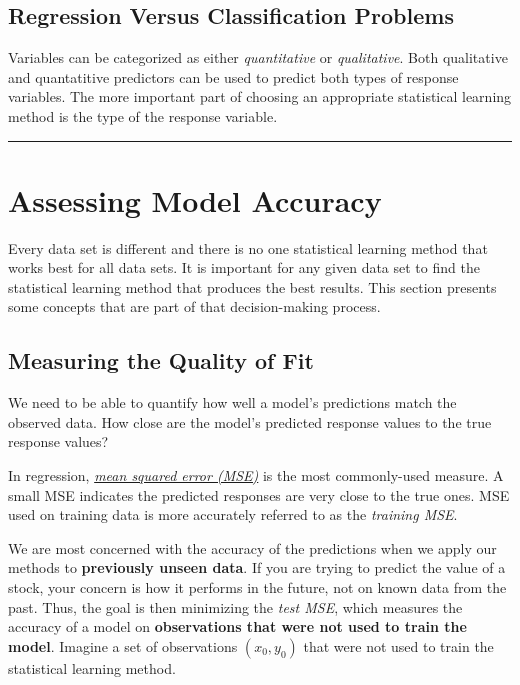 \documentclass[]{book}
\begin{document}
\hypertarget{regression-versus-classification-problems}{%
\subsection{Regression Versus Classification Problems}\label{regression-versus-classification-problems}}

Variables can be categorized as either \emph{quantitative} or \emph{qualitative}. Both qualitative and quantatitive predictors can be used to predict both types of response variables. The more important part of choosing an appropriate statistical learning method is the type of the response variable.

\begin{center}\rule{0.5\linewidth}{\linethickness}\end{center}

\hypertarget{assessing-model-accuracy}{%
\section{Assessing Model Accuracy}\label{assessing-model-accuracy}}

Every data set is different and there is no one statistical learning method that works best for all data sets. It is important for any given data set to find the statistical learning method that produces the best results. This section presents some concepts that are part of that decision-making process.

\hypertarget{measuring-the-quality-of-fit}{%
\subsection{Measuring the Quality of Fit}\label{measuring-the-quality-of-fit}}

We need to be able to quantify how well a model's predictions match the observed data. How close are the model's predicted response values to the true response values?

In regression, \href{https://en.wikipedia.org/wiki/Mean_squared_error}{\emph{mean squared error (MSE)}} is the most commonly-used measure. A small MSE indicates the predicted responses are very close to the true ones. MSE used on training data is more accurately referred to as the \emph{training MSE}.

We are most concerned with the accuracy of the predictions when we apply our methods to \textbf{previously unseen data}. If you are trying to predict the value of a stock, your concern is how it performs in the future, not on known data from the past. Thus, the goal is then minimizing the \emph{test MSE}, which measures the accuracy of a model on \textbf{observations that were not used to train the model}. Imagine a set of observations \((x_0, y_0)\) that were not used to train the statistical learning method.
\end{document}
